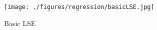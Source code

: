 \begin{figure}[ht!]
\ifisPPT
\noindent{}
\else
\texttt{[image: ./figures/regression/basicLSE.jpg]}
\fi
\centering
\caption{Basic LSE}
\label{fig:basicLSE}
\end{figure}

